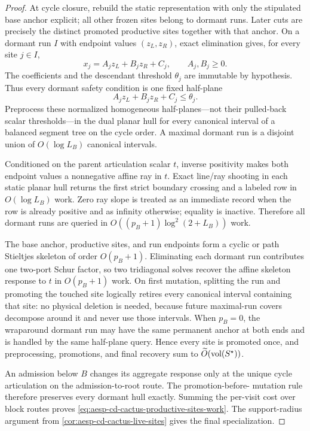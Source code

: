 \begin{proof}
At cycle closure, rebuild the static representation with only the stipulated
base anchor explicit; all other frozen sites belong to dormant runs.  Later
cuts are precisely the distinct promoted productive sites together with that
anchor.  On a dormant run
$I$ with endpoint values $(z_L,z_R)$, exact elimination gives, for every site
$j\in I$,
\begin{equation*}
 x_j=A_jz_L+B_jz_R+C_j,
 \qquad A_j,B_j\geq0.
\end{equation*}
The coefficients and the descendant threshold $\theta_j$ are immutable by
hypothesis.  Thus every dormant safety condition is one fixed half-plane
\begin{equation*}
 A_jz_L+B_jz_R+C_j\leq\theta_j.
\end{equation*}
Preprocess these normalized homogeneous half-planes---not their pulled-back
scalar thresholds---in the dual planar hull for every canonical interval of a
balanced segment tree on the cycle order.  A maximal dormant run is a
disjoint union of $O(\log L_B)$ canonical intervals.

Conditioned on the parent articulation scalar $t$, inverse positivity makes
both endpoint values a nonnegative affine ray in $t$.  Exact line/ray
shooting in each static planar hull returns the first strict boundary crossing
and a labeled row in $O(\log L_B)$ work.  Zero ray slope is treated as an
immediate record when the row is already positive and as infinity otherwise;
equality is inactive.  Therefore all dormant runs are queried in
$O((p_B+1)\log^2(2+L_B))$ work.

The base anchor, productive sites, and run endpoints form a cyclic or path Stieltjes
skeleton of order $O(p_B+1)$.  Eliminating each dormant run contributes one
two-port Schur factor, so two tridiagonal solves recover the affine skeleton
response to $t$ in $O(p_B+1)$ work.  On first mutation, splitting the run and
promoting the touched site logically retires every canonical interval
containing that site: no physical deletion is needed, because future
maximal-run covers decompose around it and never use those intervals.  When
$p_B=0$, the wraparound dormant run may have the
same permanent anchor at both ends and is handled by the same half-plane query.
Hence every site is promoted once, and preprocessing, promotions, and final
recovery sum to $\widetilde O(\operatorname{vol}(S^\star))$.

An admission below $B$ changes its aggregate response only at the unique
cycle articulation on the admission-to-root route.  The promotion-before-
mutation rule therefore preserves every dormant hull exactly.  Summing the
per-visit cost over block routes proves
\cref{eq:aesp-cd-cactus-productive-sites-work}.  The support-radius argument
from \cref{cor:aesp-cd-cactus-live-sites} gives the final specialization.
\end{proof}

